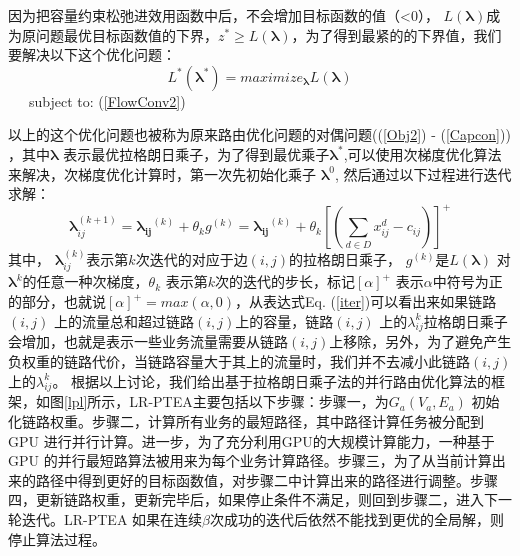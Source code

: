 因为把容量约束松弛进效用函数中后，不会增加目标函数的值（<0）， $L(\mathbf{\lambda})$成为原问题最优目标函数值的下界，$z^* \ge L(\mathbf{\lambda})$，为了得到最紧的的下界值，我们要解决以下这个优化问题：
 \begin{equation}\label{dual}
L^*(\mathbf{\lambda^*}) = maximize_{\mathbf{\lambda}}L(\mathbf{\lambda})
\end{equation}
~~~subject to: (\ref{FlowConv2})
 \vskip 0.2cm

以上的这个优化问题也被称为原来路由优化问题的对偶问题((\ref{Obj2}) - (\ref{Capcon})) \cite{NetworkFlow}，其中$\mathbf{\lambda}$ 表示最优拉格朗日乘子，为了得到最优乘子$\mathbf{\lambda^*}$,可以使用次梯度优化算法来解决，次梯度优化计算时，第一次先初始化乘子 $\mathbf{\lambda}^0$, 然后通过以下过程进行迭代求解：
\begin{equation}\label{iter}
   \mathbf{\lambda}_{ij}^{(k+1)} =\mathbf{\lambda_{ij}}^{(k)}+\theta_{k} g^{(k)}= \mathbf{\lambda_{ij}}^{(k)} + \theta_k[(\sum\limits_{d \in D}x_{ij}^d - c_{ij})]^+
\end{equation}
其中， $\mathbf{\lambda}_{ij}^{(k)}$表示第$k$次迭代的对应于边$(i,j)$的拉格朗日乘子， $g^{(k)}$是$L(\mathbf{\lambda})$ 对$\mathbf{\lambda}^{k}$的任意一种次梯度，$\theta_k$ 表示第$k$次的迭代的步长，标记$[\alpha]^+$ 表示$\alpha$中符号为正的部分，也就说$[\alpha]^+=max(\alpha, 0)$，从表达式Eq. (\ref{iter})可以看出来如果链路$(i,j)$ 上的流量总和超过链路$(i,j)$上的容量，链路$(i,j)$ 上的$\lambda_{ij}^k$拉格朗日乘子会增加，也就是表示一些业务流量需要从链路$(i,j)$上移除，另外，为了避免产生负权重的链路代价，当链路容量大于其上的流量时，我们并不去减小此链路$(i,j)$上的$\lambda_{ij}^k$。
 根据以上讨论，我们给出基于拉格朗日乘子法的并行路由优化算法的框架，如图\ref{lpl}所示，LR-PTEA主要包括以下步骤：步骤一，为$G_a(V_a, E_a)$ 初始化链路权重。步骤二，计算所有业务的最短路径，其中路径计算任务被分配到GPU 进行并行计算。进一步，为了充分利用GPU的大规模计算能力，一种基于GPU 的并行最短路算法被用来为每个业务计算路径。步骤三，为了从当前计算出来的路径中得到更好的目标函数值，对步骤二中计算出来的路径进行调整。步骤四，更新链路权重，更新完毕后，如果停止条件不满足，则回到步骤二，进入下一轮迭代。LR-PTEA 如果在连续$\beta$次成功的迭代后依然不能找到更优的全局解，则停止算法过程。
